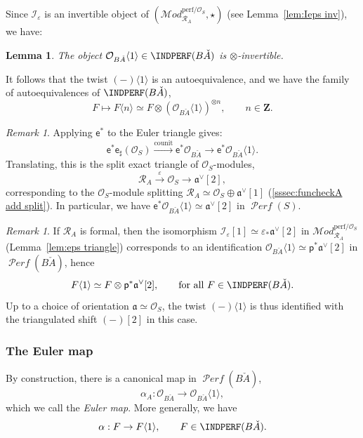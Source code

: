 \documentclass[12pt, oneside]{amsart}
\numberwithin{equation}{section}
\newtheorem{lemma}[subsubsection]{Lemma}
\theoremstyle{remark}
\newtheorem{remark}[subsubsection]{Remark}
\theoremstyle{plain}
\newcommand{\MOD}{\mathcal{M}\textit{od}}
\DeclareMathOperator{\PERF}{\mathcal{P}\textit{erf}}
\newcommand{\R}{\mathcal{R}}
\newcommand{\RA}{\R_A}
\newcommand{\fra}{\mathfrak{a}}
\newcommand{\frav}{\mathfrak{a}^\vee}
\newcommand{\OO}{\mathcal{O}}
\newcommand{\bZ}{\mathbf{Z}}
\newcommand{\Thom}[1]{\langle #1 \rangle}
\newcommand{\eps}{\varepsilon}
\newcommand{\sfp}{\mathsf{p}}
\newcommand{\sfe}{\mathsf{e}}
\begin{document}
Since $\mathcal{I}_{\eps}$ is an invertible object of $(\MOD_{\RA}^{\mathrm{perf}/\OO_S}, \star)$ (see Lemma~\ref{lem:Ieps inv}), we have:

\begin{lemma}\label{lem:Thom inv}
	The object $\OO_{B\check{A}}\Thom{1} \in \INDPERF(B\check{A})$ is $\otimes$-invertible.
\end{lemma}

It follows that the twist $(-)\Thom{1}$ is an autoequivalence, and we have the family of autoequivalences of $\INDPERF(B\check{A})$,
\[
  F \mapsto F\Thom{n} \simeq F \otimes (\OO_{B\check{A}}\Thom{1})^{\otimes n},
  \qquad n \in \bZ.
\]

\begin{remark}\label{rem:sfe^*O<1>}
  Applying $\sfe^*$ to the Euler triangle gives:
  \[
    \sfe^*\sfe_\sharp (\OO_S)
    \xrightarrow{\mathrm{counit}} \sfe^*\OO_{B\check{A}}
    \to \sfe^*\OO_{B\check{A}}\Thom{1}.
  \]
  Translating, this is the split exact triangle of $\OO_S$-modules,
  \[
    \RA \xrightarrow{\eps}
    \OO_S \to
    \frav[2],
  \]
  corresponding to the $\OO_S$-module splitting $\RA \simeq \OO_S \oplus \frav[1]$ (\ref{sssec:funcheckA add split}).
  In particular, we have $\sfe^*\OO_{B\check{A}}\Thom{1} \simeq \frav[2]$ in $\PERF(S)$.
\end{remark}

\begin{remark}\label{rem:Thom=2-shift}
	If $\RA$ is formal, then the isomorphism $\mathcal{I}_{\eps}[1] \simeq \eps_* \frav[2]$ in $\MOD_{\RA}^{\mathrm{perf}/\OO_S}$ (Lemma~\ref{lem:eps triangle}) corresponds to an identification $\OO_{B\check{A}}\Thom{1} \simeq \sfp^* \frav [2]$ in $\PERF(B\check{A})$, hence
	\[
		F\Thom{1} \simeq F \otimes \sfp^* \frav[2],
		\qquad \text{for all $F \in \INDPERF(B\check{A})$.}
	\]
	Up to a choice of orientation $\fra \simeq \OO_S$, the twist $(-)\Thom{1}$ is thus identified with the triangulated shift $(-)[2]$ in this case.
\end{remark}

\subsubsection{The Euler map}\label{sssec:Euler map}

By construction, there is a canonical map in $\PERF(B\check{A})$,
\[
  \alpha_A : \OO_{B\check{A}} \to \OO_{B\check{A}}\Thom{1},
\]
which we call the \emph{Euler map}.
More generally, we have
\[
  \alpha : F \to F\Thom{1}, \qquad F \in \INDPERF(B\check{A}).
\]
\end{document}
